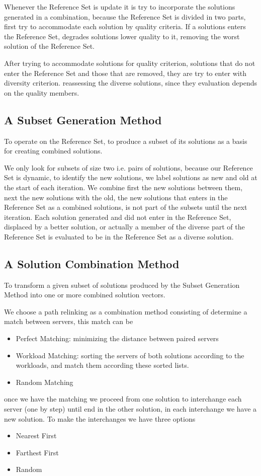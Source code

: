 Whenever the Reference Set is update
it is try to incorporate
the solutions generated in a combination,
because the Reference Set is divided
in two parts,
first try to accommodate each solution
by quality criteria.
If a solutions enters the Reference Set,
degrades solutions lower quality to it,
removing the worst solution of the Reference Set.

After trying to accommodate solutions
for quality criterion,
solutions that do not enter the Reference Set
and those that are removed,
they are try to enter with diversity criterion.
reassessing the diverse solutions,
since they evaluation depends
on the quality members.

\subsection{A Subset Generation Method}
To operate on the Reference Set,
to produce a subset of its solutions
as a basis for creating combined solutions.

We only look for subsets of size two
i.e. pairs of solutions,
because our Reference Set is dynamic,
to identify the new solutions,
we label solutions as new and old
at the start of each iteration.
We combine first the new solutions
between them,
next the new solutions with the old,
the new solutions that enters in the Reference Set
as a combined solutions,
is not part of the subsets
until the next iteration.
Each solution generated
and did not enter in the Reference Set,
displaced by a better solution,
or actually
a member of the diverse part of the Reference Set
is evaluated to be in the Reference Set
as a diverse solution.

\subsection{A Solution Combination Method}
To transform a given subset of solutions 
produced by the Subset Generation Method
into
one or more combined solution vectors.

We choose a path relinking as a combination method
consisting of
determine a match between servers,
this match can be
\begin{itemize}
\item Perfect Matching:
  minimizing the distance between paired servers
\item Workload Matching:
  sorting the servers of both solutions
  according to the workloads,
  and match them according these sorted lists.
\item Random Matching
\end{itemize}
once we have the matching
we proceed from one solution
to interchange each server
(one by step)
until end in the other solution,
in each interchange
we have a new solution.
To make the interchanges
we have three options
\begin{itemize}
\item Nearest First
\item Farthest First
\item Random
\end{itemize}

